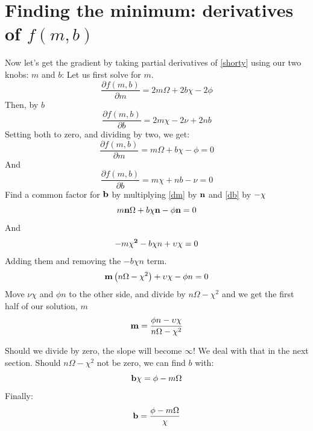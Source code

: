 \documentclass{article}
\begin{document}
\section{Finding the minimum: derivatives of  $f(m, b)$}
Now let's get the gradient by taking partial derivatives of \eqref{shorty} using our two knobs: $m$ and $b$:
Let us first solve for $m$.
\begin{equation}
\frac{\partial f(m,b)}{\partial m} = 2 m \Omega + 2 b \chi  - 2 \phi
\end{equation}
Then, by $b$
\begin{equation}
\frac{\partial f(m,b)}{\partial b} = 2 m \chi - 2 \nu + 2 n b
\end{equation}
Setting both to zero, and dividing by two, we get:
\begin{equation}
\label{dm}
\frac{\partial f(m,b)}{\partial m} = m \Omega + b \chi - \phi = 0
\end{equation}
And
\begin{equation}
\label{db}
\frac{\partial f(m,b)}{\partial b} =  m \chi + nb - \nu = 0
\end{equation}
Find a common factor for ${\bf b}$ by multiplying \eqref{dm} by ${\bf n}$ and \eqref{db} by ${\bf -\chi}$
\begin{equation}
m {\bf n}  \Omega +  b \chi {\bf n}  -  \phi {\bf n} = 0
\end{equation}
And
\begin{equation}
- m {\bf \chi^2}  - b {\bf \chi} n  +  \upsilon {\bf \chi} = 0
\end{equation}
Adding them and removing the $-b\chi n$ term.
\begin{equation}
{\bf m} \left( n \Omega - \chi^2 \right) + \upsilon \chi - \phi n = 0
\end{equation}
Move $\nu \chi$ and $\phi n$ to the other side, and divide by
$n \Omega - \chi^2$ and we get the first half of our solution, ${m}$
\begin{equation}
{\bf m} = \frac{\phi n - \upsilon \chi }{n \Omega - \chi^2}
\end{equation}

Should we divide by zero, the slope will become $\infty$!
We deal with that in the next section.
Should $n \Omega - \chi^2$ not be zero, we can find $b$ with:
\begin{equation}
{\bf b} \chi = \phi - m \Omega 
\end{equation}
Finally:
\begin{equation}
{\bf b} = \frac{\phi - m \Omega}{\chi}
\end{equation}
\end{document}
